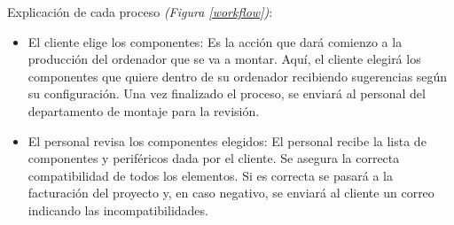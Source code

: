 Explicación de cada proceso \textit{(Figura \ref{workflow})}:
\begin{itemize}
    \item El cliente elige los componentes: Es la acción que dará comienzo a la producción del ordenador que se va a montar. Aquí, el cliente elegirá los componentes que quiere dentro de su ordenador recibiendo sugerencias según su configuración. Una vez finalizado el proceso, se enviará al personal del departamento de montaje para la revisión.
    \item El personal revisa los componentes elegidos: El personal recibe la lista de componentes y periféricos dada por el cliente. Se asegura la correcta compatibilidad de todos los elementos. Si es correcta se pasará a la facturación del proyecto y, en caso negativo, se enviará al cliente un correo indicando las incompatibilidades. 
\end{itemize}


